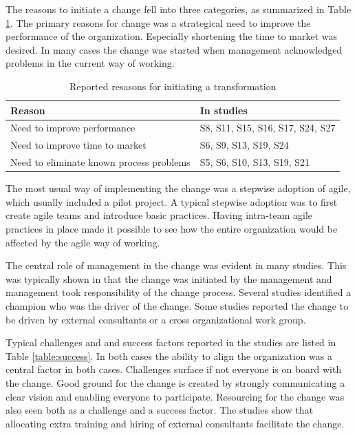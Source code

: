\documentclass[lnbip]{svmultln}
\begin{document}
The reasons to initiate a change fell into three categories, as summarized in
Table \ref{table:motivations}. The primary reasons for change was a strategical
need to improve the performance of the organization. Especially shortening the
time to market was desired. In many cases the change was started when management
acknowledged problems in the current way of working.

\begin{table}
    \begin{tabular}{ l@{ \hskip 0.4cm } l }
        \toprule
        Reason                                    & In studies   \\ \midrule
        Need to improve performance               & S8, S11, S15, S16, S17, S24, S27 \\ 
        Need to improve time to market            & S6, S9, S13, S19, S24 \\
        Need to eliminate known process problems  & S5, S6, S10, S13, S19, S21 \\
        \bottomrule
    \end{tabular}
    \caption{Reported resasons for initiating a transformation}
    \label{table:motivations}
\end{table}


The most usual way of implementing the change was a stepwise adoption of agile,
which usually included a pilot project. A typical stepwise adoption was to first
create agile teams and introduce basic practices. Having intra-team agile
practices in place made it possible to see how the entire organization would be
affected by the agile way of working.

The central role of management in the change was evident in many studies. This
was typically shown in that the change was initiated by the management and
management took responsibility of the change process. Several studies identified
a champion who was the driver of the change. Some studies reported the change to
be driven by external consultants or a cross organizational work group.

Typical challenges and and success factors reported in the studies are listed in
Table \ref{table:success}. In both cases the ability to align the organization
was a central factor in both cases. Challenges surface if not everyone is on
board with the change. Good ground for the change is created by strongly
communicating a clear vision and enabling everyone to participate. Resourcing
for the change was also seen both as a challenge and a success factor.
The studies show that allocating extra training and hiring of external consultants
facilitate the change.
\end{document}
